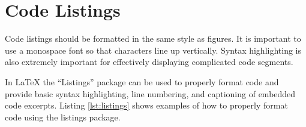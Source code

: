 \section{Code Listings}
	\label{sec:typesetting_listings}
	
	Code listings should be formatted in the same style as figures. It is important to use a monospace font so that characters line up vertically. Syntax highlighting is also extremely important for effectively displaying complicated code segments.  
	
	
	
	In LaTeX the ``Listings'' package can be used to properly format code and provide basic syntax highlighting, line numbering, and captioning of embedded code excerpts. Listing \ref{lst:listings} shows examples of how to properly format code using the listings package. 
	
	\newpage
	
	